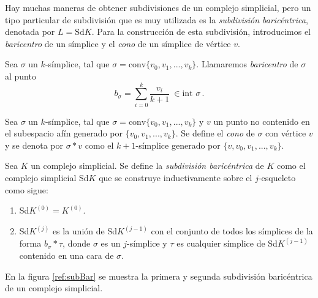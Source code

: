 Hay muchas maneras de obtener subdivisiones de un complejo simplicial, pero un tipo particular de subdivisión que es muy utilizada es la \emph{subdivisión baricéntrica}, denotada por $L = \text{Sd}K$. Para la construcción de esta subdivisión, introducimos el \emph{baricentro} de un símplice y el \emph{cono} de un símplice de vértice $v$.

\begin{definition}
Sea $\sigma$ un $k$-símplice, tal que $\sigma = \text{conv}\{v_0, v_1, ..., v_k\}$. Llamaremos \emph{baricentro} de $\sigma$ al punto
\[
b_\sigma = \sum_{i=0}^{k} \frac{v_i}{k+1}\ \in \text{int }\sigma\,.
\]
\end{definition}

\begin{definition}
Sea $\sigma$ un $k$-símplice, tal que $\sigma = \text{conv}\{v_0, v_1, ..., v_k\}$ y $v$ un punto no contenido en el subespacio afín generado por $\{v_0, v_1, ..., v_k\}$. Se define el \emph{cono} de $\sigma$ con vértice $v$ y se denota por $\sigma*v$ como el $k+1$-símplice generado por $\{v,v_0, v_1, ..., v_k\}$.
\end{definition}

\begin{definition}
Sea $K$ un complejo simplicial. Se define la \emph{subdivisión baricéntrica} de $K$ como el complejo simplicial Sd$K$ que se construye inductivamente sobre el $j$-esqueleto como sigue:
\begin{enumerate}
	\item Sd$K^{(0)} = K^{(0)}$.
	\item Sd$K^{(j)}$ es la unión de Sd$K^{(j-1)}$ con el conjunto de todos los símplices de la forma $b_\sigma*\tau$, donde $\sigma$ es un $j$-símplice y $\tau$ es cualquier símplice de Sd$K^{(j-1)}$ contenido en una cara de $\sigma$.
\end{enumerate}
\end{definition}
En la figura \ref{ref:subBar} se muestra la primera y segunda subdivisión baricéntrica de un complejo simplicial.

